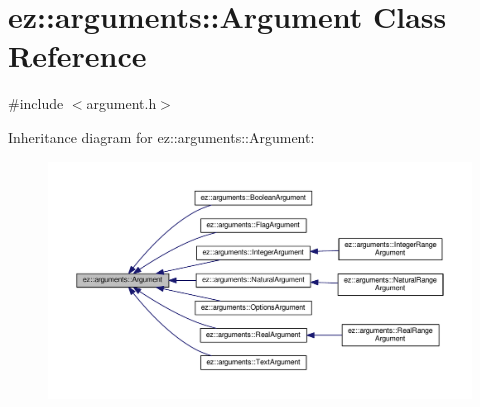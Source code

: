 \hypertarget{classez_1_1arguments_1_1Argument}{}\section{ez\+:\+:arguments\+:\+:Argument Class Reference}
\label{classez_1_1arguments_1_1Argument}


{\ttfamily \#include $<$argument.\+h$>$}



Inheritance diagram for ez\+:\+:arguments\+:\+:Argument\+:
\nopagebreak
\begin{figure}[H]
\begin{center}
\leavevmode
\includegraphics[width=350pt]{classez_1_1arguments_1_1Argument__inherit__graph}
\end{center}
\end{figure}
